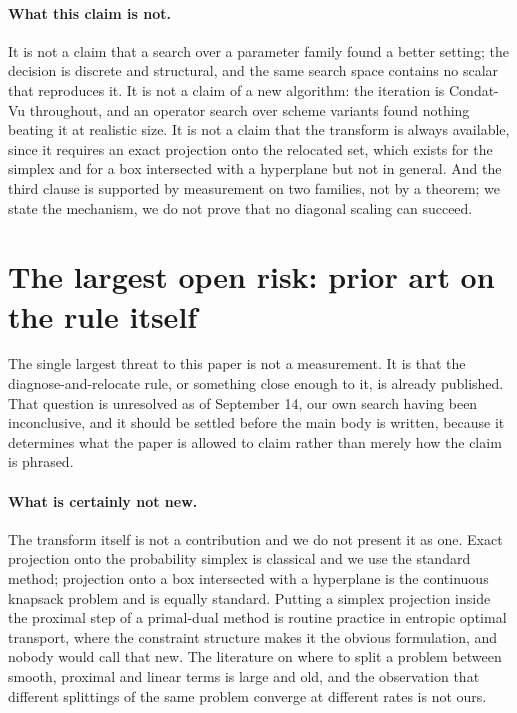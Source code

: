 \documentclass[11pt]{article}
\begin{document}
\paragraph{What this claim is not.}
It is not a claim that a search over a parameter family found a better
setting; the decision is discrete and structural, and the same search space
contains no scalar that reproduces it. It is not a claim of a new algorithm:
the iteration is Condat-Vu throughout, and an operator search over scheme
variants found nothing beating it at realistic size. It is not a claim that
the transform is always available, since it requires an exact projection onto
the relocated set, which exists for the simplex and for a box intersected
with a hyperplane but not in general. And the third clause is supported by
measurement on two families, not by a theorem; we state the mechanism, we do
not prove that no diagonal scaling can succeed.

\section{The largest open risk: prior art on the rule itself}
\label{app:priorart}

The single largest threat to this paper is not a measurement. It is that the
diagnose-and-relocate rule, or something close enough to it, is already
published. That question is unresolved as of September 14, our own search
having been inconclusive, and it should be settled before the main body is
written, because it determines what the paper is allowed to claim rather than
merely how the claim is phrased.

\paragraph{What is certainly not new.}
The transform itself is not a contribution and we do not present it as one.
Exact projection onto the probability simplex is classical and we use the
standard method; projection onto a box intersected with a hyperplane is the
continuous knapsack problem and is equally standard. Putting a simplex
projection inside the proximal step of a primal-dual method is routine
practice in entropic optimal transport, where the constraint structure makes
it the obvious formulation, and nobody would call that new. The literature on
where to split a problem between smooth, proximal and linear terms is large
and old, and the observation that different splittings of the same problem
converge at different rates is not ours.
\end{document}

